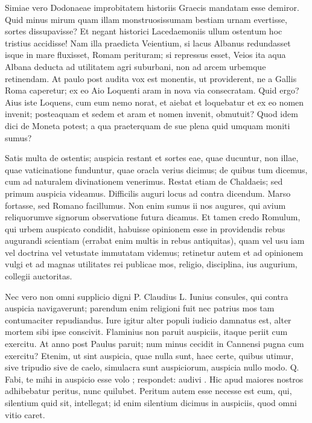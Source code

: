  Simiae vero Dodonaeae improbitatem historiis Graecis mandatam esse demiror. Quid minus mirum quam illam monstruosissumam bestiam urnam evertisse, sortes dissupavisse? Et negant historici Lacedaemoniis ullum ostentum hoc tristius accidisse! Nam illa praedicta Veientium, si lacus Albanus redundasset isque in mare fluxisset, Romam perituram; si repressus esset, Veios ita aqua Albana deducta ad utilitatem agri suburbani, non ad arcem urbemque retinendam. At paulo post audita vox est monentis, ut providerent, ne a Gallis Roma caperetur; ex eo Aio Loquenti aram in nova via consecratam. Quid ergo? Aius iste Loquens, cum eum nemo norat, et aiebat et loquebatur et ex eo nomen invenit; posteaquam et sedem et aram et nomen invenit, obmutuit? Quod idem dici de Moneta potest; a qua praeterquam de sue plena quid umquam moniti sumus?

 Satis multa de ostentis; auspicia restant et sortes eae, quae ducuntur, non illae, quae vaticinatione funduntur, quae oracla verius dicimus; de quibus tum dicemus, cum ad naturalem divinationem venerimus. Restat etiam de Chaldaeis; sed primum auspicia videamus. Difficilis auguri locus ad contra dicendum. Marso fortasse, sed Romano facillumus. Non enim sumus ii nos augures, qui avium reliquorumve signorum observatione futura dicamus. Et tamen credo Romulum, qui urbem auspicato condidit, habuisse opinionem esse in providendis rebus augurandi scientiam (errabat enim multis in rebus antiquitas), quam vel usu iam vel doctrina vel vetustate immutatam videmus; retinetur autem et ad opinionem vulgi et ad magnas utilitates rei publicae mos, religio, disciplina, ius augurium, collegii auctoritas.

 Nec vero non omni supplicio digni P. Claudius L. Iunius consules, qui contra auspicia navigaverunt; parendum enim religioni fuit nec patrius mos tam contumaciter repudiandus. Iure igitur alter populi iudicio damnatus est, alter mortem sibi ipse conscivit. Flaminius non paruit auspiciis, itaque periit cum exercitu. At anno post Paulus paruit; num minus cecidit in Cannensi pugna cum exercitu? Etenim, ut sint auspicia, quae nulla sunt, haec certe, quibus utimur, sive tripudio sive de caelo, simulacra sunt auspiciorum, auspicia nullo modo. Q. Fabi, te mihi in auspicio esse volo ; respondet: audivi . Hic apud maiores nostros adhibebatur peritus, nunc quilubet. Peritum autem esse necesse est eum, qui, silentium quid sit, intellegat; id enim silentium dicimus in auspiciis, quod omni vitio caret.

